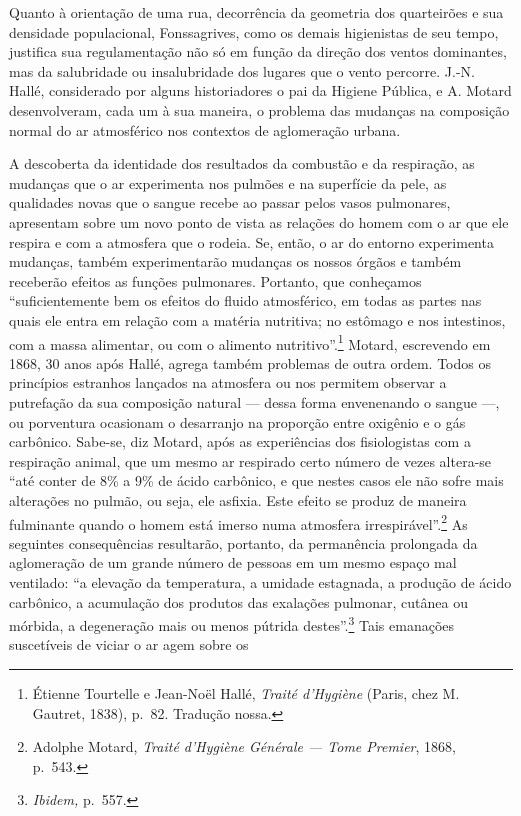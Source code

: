 Quanto à orientação de uma rua, decorrência da geometria dos quarteirões
e sua densidade populacional, Fonssagrives, como os demais higienistas
de seu tempo, justifica sua regulamentação não só em função da direção
dos ventos dominantes, mas da salubridade ou insalubridade dos lugares
que o vento percorre. J.-N. Hallé, considerado por alguns historiadores
o pai da Higiene Pública, e A. Motard desenvolveram, cada um à sua
maneira, o problema das mudanças na composição normal do ar atmosférico
nos contextos de aglomeração urbana.

A descoberta da identidade dos resultados da combustão e da respiração,
as mudanças que o ar experimenta nos pulmões e na superfície da pele, as
qualidades novas que o sangue recebe ao passar pelos vasos pulmonares,
apresentam sobre um novo ponto de vista as relações do homem com o ar
que ele respira e com a atmosfera que o rodeia. Se, então, o ar do
entorno experimenta mudanças, também experimentarão mudanças os nossos
órgãos e também receberão efeitos as funções pulmonares. Portanto, que
conheçamos ``suficientemente bem os efeitos do fluido atmosférico, em
todas as partes nas quais ele entra em relação com a matéria nutritiva;
no estômago e nos intestinos, com a massa alimentar, ou com o alimento
nutritivo''.\footnote{Étienne Tourtelle e Jean-Noël Hallé, \textit{Traité
  d'Hygiène} (Paris, chez M. Gautret, 1838), p.~82. Tradução nossa.}
Motard, escrevendo em 1868, 30 anos após Hallé, agrega também problemas
de outra ordem. Todos os princípios estranhos lançados na atmosfera ou
nos permitem observar a putrefação da sua composição natural --- dessa
forma envenenando o sangue ---, ou porventura ocasionam o desarranjo na
proporção entre oxigênio e o gás carbônico. Sabe-se, diz Motard, após as
experiências dos fisiologistas com a respiração animal, que um mesmo ar
respirado certo número de vezes altera-se ``até conter de 8\% a 9\% de
ácido carbônico, e que nestes casos ele não sofre mais alterações no
pulmão, ou seja, ele asfixia. Este efeito se produz de maneira
fulminante quando o homem está imerso numa atmosfera
irrespirável''.\footnote{Adolphe Motard, \textit{Traité d'Hygiène Générale
  --- Tome Premier}, 1868, p.~543.} As seguintes consequências
resultarão, portanto, da permanência prolongada da aglomeração de um
grande número de pessoas em um mesmo espaço mal ventilado: ``a elevação
da temperatura, a umidade estagnada, a produção de ácido carbônico, a
acumulação dos produtos das exalações pulmonar, cutânea ou mórbida, a
degeneração mais ou menos pútrida destes''.\footnote{\textit{Ibidem,}
  p.~557.} Tais emanações suscetíveis de viciar o ar agem sobre os
